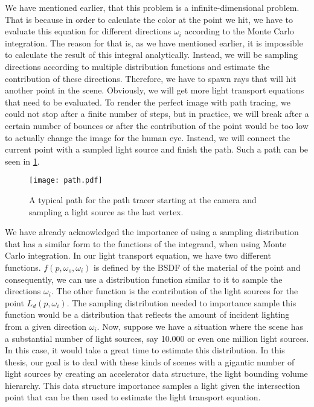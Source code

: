 We have mentioned earlier, that this problem is a infinite-dimensional problem. That is because in order to calculate the color at the point we hit, we have to evaluate this equation for different directions $\omega_i$ according to the Monte Carlo integration. The reason for that is, as we have mentioned earlier, it is impossible to calculate the result of this integral analytically. Instead, we will be sampling directions according to multiple distribution functions and estimate the contribution of these directions. Therefore, we have to spawn rays that will hit another point in the scene. Obviously, we will get more light transport equations that need to be evaluated. To render the perfect image with path tracing, we could not stop after a finite number of steps, but in practice, we will break after a certain number of bounces or after the contribution of the point would be too low to actually change the image for the human eye. Instead, we will connect the current point with a sampled light source and finish the path. Such a path can be seen in \ref{fig:path}.

\begin{figure}
	\begin{center}
		\texttt{[image: path.pdf]}
		\caption{A typical path for the path tracer starting at the camera and sampling a light source as the last vertex.}
		\label{fig:path}
	\end{center}
\end{figure}

We have already acknowledged the importance of using a sampling distribution that has a similar form to the functions of the integrand, when using Monte Carlo integration. In our light transport equation, we have two different functions. $f(p, \omega_o, \omega_i)$ is defined by the BSDF of the material of the point and consequently, we can use a distribution function similar to it to sample the directions $\omega_i$. The other function is the contribution of the light sources for the point $L_d(p, \omega_i)$. The sampling distribution needed to importance sample this function would be a distribution that reflects the amount of incident lighting from a given direction $\omega_i$. Now, suppose we have a situation where the scene has a substantial number of light sources, say 10.000 or even one million light sources. In this case, it would take a great time to estimate this distribution. In this thesis, our goal is to deal with these kinds of scenes with a gigantic number of light sources by creating an accelerator data structure, the light bounding volume hierarchy. This data structure importance samples a light given the intersection point that can be then used to estimate the light transport equation.